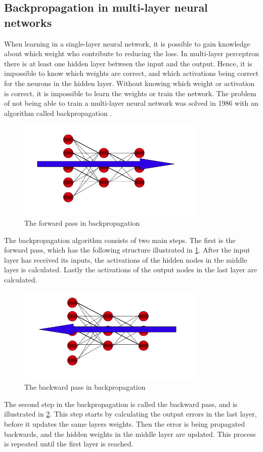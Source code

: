 \documentclass[USenglish]{ifimaster}  %
\begin{document}
\subsection{Backpropagation in multi-layer neural networks}
When learning in a single-layer neural network, it is possible to gain knowledge about which weight who contribute to reducing the loss. In multi-layer perceptron there is at least one hidden layer between the input and the output. Hence, it is impossible to know which weights are correct, and which activations being correct for the neurons in the hidden layer. Without knowing which weight or activation is correct, it is impossible to learn the weights or train the network. The problem of not being able to train a multi-layer neural network was solved in 1986 with an algorithm called backpropagation \cite{Rumelhart:1986:LIR:104279.104293}.
\begin{figure}[ht]
    \centering
    \includegraphics[width=0.8\textwidth]{bilder/forward_prop.png}
    \caption{The forward pass in backpropagation \cite{website:inf_4490_mlp}}
    \label{fig:forward_step}
\end{figure}
The backpropagation algorithm consists of two main steps. The first is the forward pass, which has the following structure illustrated in \cref{fig:forward_step}. After the input layer has received its inputs, the activations of the hidden nodes in the middle layer is calculated. Lastly the activations of the output nodes in the last layer are calculated. 
\begin{figure}[ht]
    \centering
    \includegraphics[width=0.8\textwidth]{bilder/backward_prop.png}
    \caption{The backward pass in backpropagation \cite{website:inf_4490_mlp}}
    \label{fig:backward_step}
\end{figure}
The second step in the backpropagation is called the backward pass, and is illustrated in \cref{fig:backward_step}. This step starts by calculating the output errors in the last layer, before it updates the same layers weights. Then the error is being propagated backwards, and the hidden weights in the middle layer are updated. This process is repeated until the first layer is reached.
\end{document}
